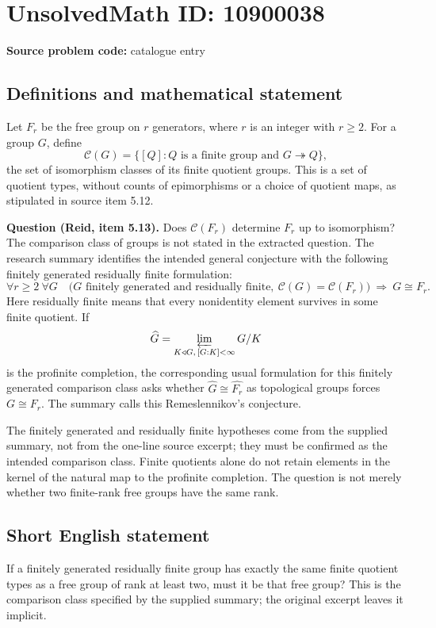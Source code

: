 \documentclass[11pt]{article}
\begin{document}
\section*{UnsolvedMath ID: 10900038}
\textbf{Source problem code:} catalogue entry
\subsection{Definitions and mathematical statement}
Let $F_r$ be the free group on $r$ generators, where $r$ is an integer with $r\ge2$. For a group $G$, define
\[
 \mathcal C(G)=\{[Q]: Q\text{ is a finite group and }G\twoheadrightarrow Q\},
\]
the set of isomorphism classes of its finite quotient groups. This is a set of quotient types, without counts of epimorphisms or a choice of quotient maps, as stipulated in source item 5.12.

\textbf{Question (Reid, item 5.13).} Does $\mathcal C(F_r)$ determine $F_r$ up to isomorphism? The comparison class of groups is not stated in the extracted question. The research summary identifies the intended general conjecture with the following finitely generated residually finite formulation:
\[
 \forall r\ge2\ \forall G\quad
 \bigl(G\text{ finitely generated and residually finite},\ 
       \mathcal C(G)=\mathcal C(F_r)\bigr)
 \ \Longrightarrow\ G\cong F_r.
\]
Here residually finite means that every nonidentity element survives in some finite quotient. If
\[
 \widehat G=\varprojlim_{K\triangleleft G,\,[G:K]<\infty}G/K
\]
is the profinite completion, the corresponding usual formulation for this finitely generated comparison class asks whether $\widehat G\cong\widehat{F_r}$ as topological groups forces $G\cong F_r$. The summary calls this Remeslennikov's conjecture.

The finitely generated and residually finite hypotheses come from the supplied summary, not from the one-line source excerpt; they must be confirmed as the intended comparison class. Finite quotients alone do not retain elements in the kernel of the natural map to the profinite completion. The question is not merely whether two finite-rank free groups have the same rank.
\subsection{Short English statement}
If a finitely generated residually finite group has exactly the same finite quotient types as a free group of rank at least two, must it be that free group? This is the comparison class specified by the supplied summary; the original excerpt leaves it implicit.
\end{document}
